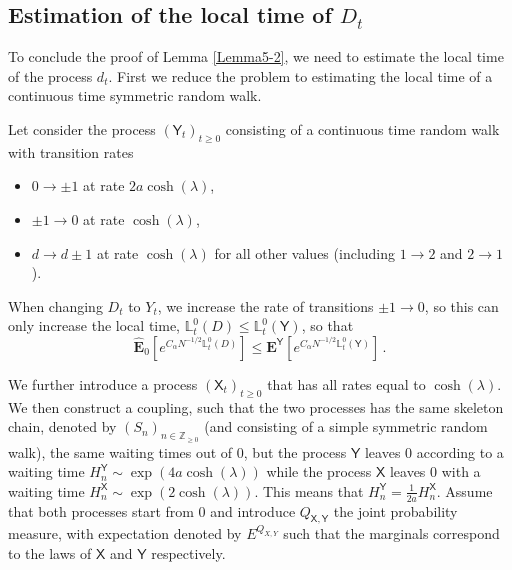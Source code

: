 \documentclass[a4paper,11pt,oneside,reqno]{amsart}
\theoremstyle{definition}
\renewcommand{\leq}{\leqslant}
\renewcommand{\geq}{\geqslant}
\numberwithin{equation}{section}
\begin{document}
{\subsection{Estimation of the local time of $D_t$}
To conclude the proof of Lemma \ref{Lemma5-2}, we need to estimate the local time of the process $d_t$. First we reduce the problem to estimating the local time of a continuous time symmetric random walk. 

Let consider the process $(\mathsf{Y}_{t})_{t\geq 0}$ consisting of a continuous time random walk with transition rates
\begin{itemize}
	\item $0 \to \pm 1$ at rate $2 a \cosh(\lambda)$, 
	\item $\pm 1 \to 0$ at rate $\cosh(\lambda)$, 
	\item $d \to d\pm 1$ at rate $\cosh(\lambda)$ for all other values (including $1\to 2$ and $2\to 1$).
\end{itemize}
When changing $D_t$ to $Y_t$, we increase the rate of transitions $\pm 1\to 0$, so this can only increase the local time, $\mathbb{L}_{t}^{0}(D) \leq \mathbb{L}_{t}^{0}(\mathsf{Y})$, so that 
\begin{equation*}
	\widehat{\mathbf{E}}_{0}\left[e^{C_{\alpha}N^{-1/2}\mathbb{L}_{t}^{0}(D)}\right]
	\leq \mathbf{E}^{\mathsf{Y}}\left[e^{C_{\alpha}N^{-1/2}\mathbb{L}_{t}^{0}(\mathsf{Y})}\right]\,.
\end{equation*}

We further introduce a process $(\mathsf{X}_{t})_{t\geq 0}$ that has all rates equal to $\cosh(\lambda)$. We then construct a coupling, such that the two processes has the same skeleton chain, denoted by $(S_{n})_{n\in \mathbb{Z}_{\geq 0}}$ (and consisting of a simple symmetric random walk), the same waiting times out of $0$, 
but the process $\mathsf{Y}$ leaves $0$ according to a waiting time $H_{n}^{\mathsf{Y}}\sim\exp(4a \cosh(\lambda))$ while the process $\mathsf{X}$ leaves $0$ with a waiting time $H_{n}^{\mathsf{X}}\sim \exp(2\cosh(\lambda))$. This means that $H_{n}^{\mathsf{Y}}= \frac{1}{2a}H_{n}^{\mathsf{X}}$. 
Assume that both processes start from $0$ and introduce $Q_{\mathsf{X},\mathsf{Y}}$ the joint probability measure, with expectation denoted by $E^{Q_{X,Y}}$ such that the marginals correspond to the laws of $\mathsf{X}$ and $\mathsf{Y}$ respectively. 

}
\end{document}
